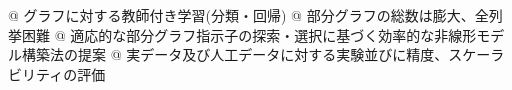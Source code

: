 \begin{tcolorbox}[title={\Large 概要}]
	\begin{easylist}[itemize]
	@ グラフに対する教師付き学習(分類・回帰)
	@ 部分グラフの総数は膨大、全列挙困難
	@ 適応的な部分グラフ指示子の探索・選択に基づく効率的な非線形モデル構築法の提案
	@ 実データ及び人工データに対する実験並びに精度、スケーラビリティの評価
	\end{easylist}
\end{tcolorbox}
